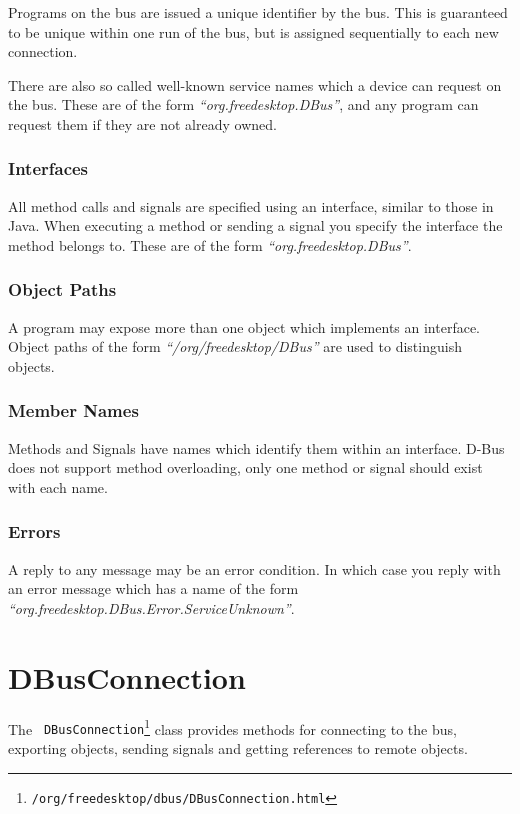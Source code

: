 \documentclass[a4paper,12pt]{article}
\begin{document}
Programs on the bus are issued a unique identifier by the bus. This
is guaranteed to be unique within one run of the bus, but is
assigned sequentially to each new connection. 

There are also so called well-known service names which a device can
request on the bus. These are of the form {\em ``org.freedesktop.DBus''},
and any program can request them if they are not already owned.

\subsubsection{Interfaces}

All method calls and signals are specified using an interface,
similar to those in Java. When executing a method or sending a
signal you specify the interface the method belongs to. These are of
the form {\em ``org.freedesktop.DBus''}.

\subsubsection{Object Paths}

A program may expose more than one object which implements an
interface. Object paths of the form {\em ``/org/freedesktop/DBus''}
are used to distinguish objects.

\subsubsection{Member Names}

Methods and Signals have names which identify them within an
interface. D-Bus does not support method overloading, only one
method or signal should exist with each name.

\subsubsection{Errors}

A reply to any message may be an error condition. In which case you reply with
an error message which has a name of the form {\em
   ``org.freedesktop.DBus.Error.ServiceUnknown''}. 

\section{DBusConnection}

The {\tt
DBusConnection\footnote{\javadocroot/org/freedesktop/dbus/DBusConnection.html}}
class provides methods for connecting to the bus, exporting objects,
sending signals and getting references to remote objects.
\end{document}
